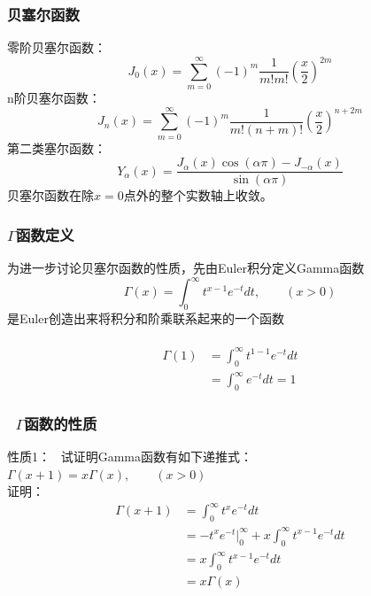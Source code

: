 \begin{frame}
	\frametitle{贝塞尔函数}
	零阶贝塞尔函数：
	\begin{equation*}
		J_0(x) = \sum\limits_{m=0}^{\infty} (-1)^m  \frac{1}{m! m! } (\frac{x}{2})^{2m} 
	\end{equation*}	
	n阶贝塞尔函数：
	\begin{equation*}
		J_n(x) = \sum\limits_{m=0}^{\infty} (-1)^m  \frac{1}{m! (n+m) ! } (\frac{x}{2})^{n+2m} 
	\end{equation*}	
	第二类塞尔函数：
	\begin{equation*}
		Y_{\alpha}(x)=\frac{J_{\alpha}(x) \cos (\alpha \pi)-J_{-\alpha}(x)}{\sin (\alpha \pi)}
	\end{equation*}	
	贝塞尔函数在除$x=0$点外的整个实数轴上收敛。
\end{frame}	

\begin{frame}
	\frametitle{$\Gamma$函数定义}
	为进一步讨论贝塞尔函数的性质，先由Euler积分定义Gamma函数
	\begin{equation*}
		\Gamma(x)=\int_{0}^{\infty} t^{x-1} e^{-t} dt, \qquad (x>0)
	\end{equation*}	
	是Euler创造出来将积分和阶乘联系起来的一个函数\\ \vspace{0.6em}
	\例 [1.试证明]
	{ \[
		\Gamma(1)=1
	   \]}
	\证 ~	
\[ \begin{aligned}
	\Gamma(1)&=\int_{0}^{\infty} t^{1-1} e^{-t} dt \\	
			&=\int_{0}^{\infty}  e^{-t} dt =1	
\end{aligned}\]
\end{frame}	

\begin{frame}	
	\frametitle{~$\Gamma$函数的性质}
	\alert{性质1：} ~试证明Gamma函数有如下递推式：\\
		$\Gamma(x+1)=x \Gamma(x),\qquad (x>0)$\\
	\alert{证明：}  
	\begin{equation*}
	\begin{split}
		\Gamma(x+1)&= \int_{0}^{\infty} t^{x} e^{-t} dt \\
		&= -t^x e^{-t} |_0 ^\infty + x \int_{0}^{\infty} t^{x-1} e^{-t} dt \\
		&= x \int_{0}^{\infty} t^{x-1} e^{-t} dt \\
		&=x \Gamma(x)
	\end{split}
	\end{equation*}	
\end{frame}	

